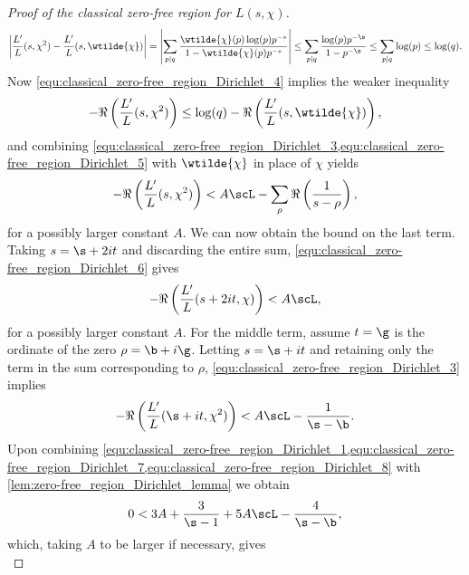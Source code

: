 \begin{proof}[Proof of the classical zero-free region for $L(s,\chi)$]
        \begin{equation}\label{equ:classical_zero-free_region_Dirichlet_4}
          \left|\frac{L'}{L}(s,\chi^{2})-\frac{L'}{L}(s,\wtilde{\chi})\right| = \left|\sum_{p \mid q}\frac{\wtilde{\chi}(p)\log(p)p^{-s}}{1-\wtilde{\chi}(p)p^{-s}}\right| \le \sum_{p \mid q}\frac{\log(p)p^{-\s}}{1-p^{-\s}} \le \sum_{p \mid q}\log(p) \le \log(q).
        \end{equation}
        Now \cref{equ:classical_zero-free_region_Dirichlet_4} implies the weaker inequality
        \begin{equation}\label{equ:classical_zero-free_region_Dirichlet_5}
          -\Re\left(\frac{L'}{L}(s,\chi^{2})\right) \le \log(q)-\Re\left(\frac{L'}{L}(s,\wtilde{\chi})\right),
        \end{equation}
        and combining \cref{equ:classical_zero-free_region_Dirichlet_3,equ:classical_zero-free_region_Dirichlet_5} with $\wtilde{\chi}$ in place of $\chi$ yields
        \begin{equation}\label{equ:classical_zero-free_region_Dirichlet_6}
            -\Re\left(\frac{L'}{L}(s,\chi^{2})\right) < A\scL-\sum_{\rho}\Re\left(\frac{1}{s-\rho}\right),
        \end{equation}
        for a possibly larger constant $A$. We can now obtain the bound on the last term. Taking $s = \s+2it$ and discarding the entire sum, \cref{equ:classical_zero-free_region_Dirichlet_6} gives
        \begin{equation}\label{equ:classical_zero-free_region_Dirichlet_7}
          -\Re\left(\frac{L'}{L}(s+2it,\chi)\right) < A\scL,
        \end{equation}
        for a possibly larger constant $A$. For the middle term, assume $t = \g$ is the ordinate of the zero $\rho = \b+i\g$. Letting $s = \s+it$ and retaining only the term in the sum corresponding to $\rho$, \cref{equ:classical_zero-free_region_Dirichlet_3} implies
        \begin{equation}\label{equ:classical_zero-free_region_Dirichlet_8}
            -\Re\left(\frac{L'}{L}(\s+it,\chi^{2})\right) < A\scL-\frac{1}{\s-\b}.
        \end{equation}
        Upon combining \cref{equ:classical_zero-free_region_Dirichlet_1,equ:classical_zero-free_region_Dirichlet_7,equ:classical_zero-free_region_Dirichlet_8} with \cref{lem:zero-free_region_Dirichlet_lemma} we obtain
        \[
          0 < 3A+\frac{3}{\s-1}+5A\scL-\frac{4}{\s-\b},
        \]
        which, taking $A$ to be larger if necessary, gives
        \begin{equation}\label{equ:zero-free_region_estimate_Dirichlet_9}

\end{equation}
\end{proof}
